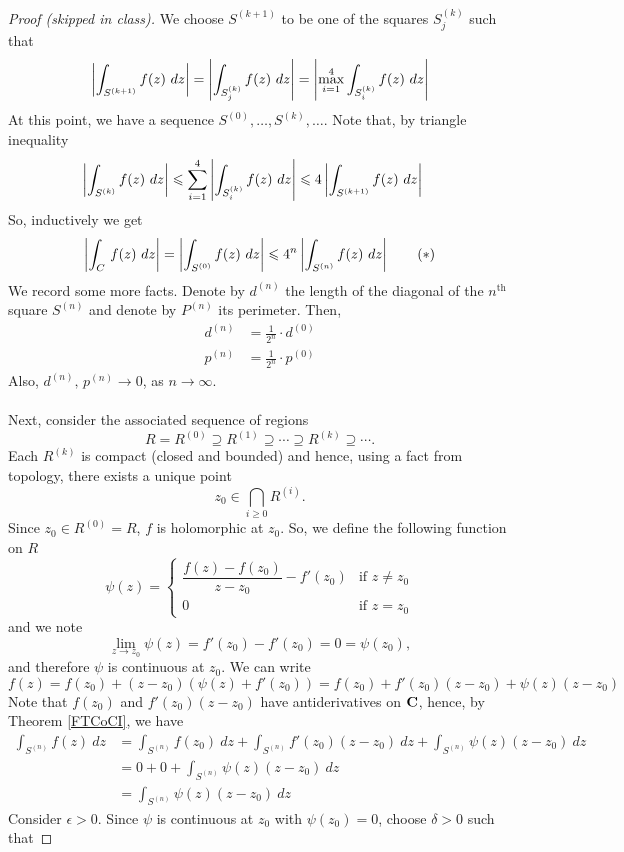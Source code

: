 \begin{proof}[Proof (skipped in class)]
We choose $S^{(k+1)}$ to be one of the squares $S^{(k)}_j$ such that 
\[\abs{\int_{S^{(k+1)}}f(z)\ dz} = \abs{\int_{S^{(k)}_j}f(z)\ dz} = \abs{\max_{i=1}^4\int_{S^{(k)}_i}f(z)\ dz}\]
At this point, we have a sequence $S^{(0)},\ldots,S^{(k)},\ldots$. Note that, by triangle inequality
\begin{align*}
\left\lvert\int_{S^{(k)}}f(z)\ dz\right\rvert & \leqslant \sum_{i=1}^4\left\lvert\int_{S^{(k)}_i}f(z)\ dz\right\rvert \leqslant 4\left\lvert\int_{S^{(k+1)}}f(z)\ dz\right\rvert
\end{align*}
So, inductively we get
\[\left\lvert\int_{C}\,f(z)\ dz\right\rvert = \left\lvert\int_{S^{(0)}}f(z)\ dz\right\rvert \leqslant 4^n\left\lvert\int_{S^{(n)}}f(z)\ dz\right\rvert \tag{$*$}\]
We record some more facts. Denote by $d^{(n)}$ the length of the diagonal of the $n^{\text{th}}$ square $S^{(n)}$ and denote by $P^{(n)}$ its perimeter. Then,
\begin{align*}
d^{(n)} &= \frac{1}{2^n}\cdot d^{(0)}\\[0.5em]
p^{(n)} &= \frac{1}{2^n}\cdot p^{(0)}
\end{align*}
Also, $d^{(n)},\,p^{(n)} \to 0$, as $n \to \infty$.\\
\\
Next, consider the associated sequence of regions
\[R = R^{(0)} \supseteq R^{(1)} \supseteq \cdots \supseteq R^{(k)} \supseteq \cdots.\]
Each $R^{(k)}$ is compact (closed and bounded) and hence, using a fact from topology, there exists a unique point
\[z_0 \in \bigcap_{i\geq 0}R^{(i)}.\]
Since $z_0 \in R^{(0)} = R$, $f$ is holomorphic at $z_0$. So, we define the following function on $R$
\[\psi(z) = \begin{cases} \dfrac{f(z) - f(z_0)}{z - z_0} - f'(z_0) & \text{if $z \neq z_0$}\\[1em] 0 & \text{if $z = z_0$} \end{cases}\]
and we note
\[\lim_{z \to z_0}\psi(z) = f'(z_0) - f'(z_0) = 0 = \psi(z_0),\]
and therefore $\psi$ is continuous at $z_0$. We can write
\[f(z) = f(z_0) + (z-z_0)(\psi(z) + f'(z_0)) = f(z_0) + f'(z_0)(z - z_0) + \psi(z)(z - z_0)\]
Note that $f(z_0)$ and $f'(z_0)(z - z_0)$ have antiderivatives on $\mathbf C$, hence, by Theorem \ref{FTCoCI}, we have
\begin{align*}
\int_{S^{(n)}}f(z)\ dz &= \int_{S^{(n)}}f(z_0)\ dz + \int_{S^{(n)}}f'(z_0)(z - z_0)\ dz + \int_{S^{(n)}}\psi(z)(z - z_0)\ dz\\[1em]
&= 0 + 0 + \int_{S^{(n)}}\psi(z)(z - z_0)\ dz\\[1em]
&= \int_{S^{(n)}}\psi(z)(z - z_0)\ dz
\end{align*}
Consider $\epsilon > 0$. Since $\psi$ is continuous at $z_0$ with $\psi(z_0) = 0$, choose $\delta > 0$ such that

\end{proof}
